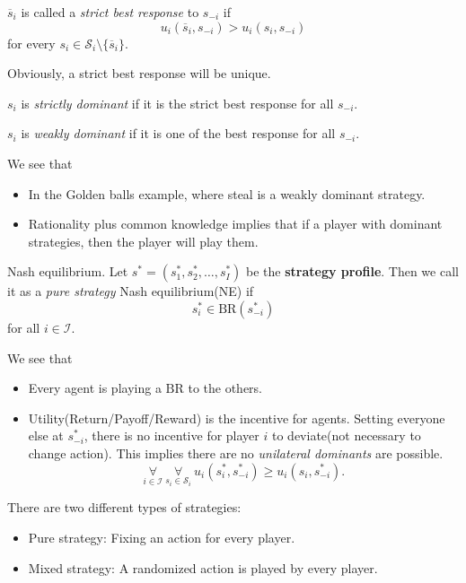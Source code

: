 \begin{definition}
	\(\overline{s}_{i}\) is called a \emph{strict best response} to \(s_{-i}\) if
	\[
		u_{i}(\overline{s}_i, s_{-i})>u_{i}(s_{i}, s_{-i})
	\]
	for every \(s_{i}\in \mathcal{S}_{i}\setminus\{\overline{s}_i\} \).
\end{definition}

\begin{remark}
	Obviously, a strict best response will be unique.
\end{remark}

\begin{definition}
	\(s_{i}\) is \emph{strictly dominant} if it is the strict best response for all \(s_{-i}\).
\end{definition}
\begin{definition}
	\(s_{i}\) is \emph{weakly dominant} if it is one of the best response for all \(s_{-i}\).
\end{definition}

\begin{remark}
	We see that
	\begin{itemize}
		\item In the Golden balls example, where steal is a weakly dominant strategy.
		\item Rationality plus common knowledge implies that if a player with dominant strategies, then the player will play them.
	\end{itemize}
\end{remark}

\hr

\begin{prev}
	Nash equilibrium. Let \(s^{*} = (s_1^{*}, s_2^{*}, \ldots , s_I^{*})\) be the \textbf{strategy profile}. Then we call it as a
	\emph{pure strategy} Nash equilibrium(NE) if
	\[
		s_{i}^{*}\in\mathrm{BR}(s_{-i}^{*})
	\]
	for all \(i\in \mathcal{I} \).
\end{prev}

\begin{note}
	We see that
	\begin{itemize}
		\item Every agent is playing a \(\mathrm{BR}\) to the others.
		\item Utility(Return/Payoff/Reward) is the incentive for agents. Setting everyone else at \(s^{*}_{-i}\), there is no incentive for player \(i\) to deviate(not necessary to change action). This implies there are no \emph{unilateral dominants} are possible.
		      \[
			      \underset{i\in \mathcal{I}}{\forall}\ \underset{s_{i}\in \mathcal{S}_i}{\forall}\ u_{i}(s^{*}_i, s^{*}_{-i}) \geq u_{i}(s_{i}, s^{*}_{-i}).
		      \]
	\end{itemize}
	\begin{prev}
		There are two different types of strategies:
		\begin{itemize}
			\item Pure strategy: Fixing an action for every player.
			\item Mixed strategy: A randomized action is played by every player.
		\end{itemize}
	\end{prev}
\end{note}

